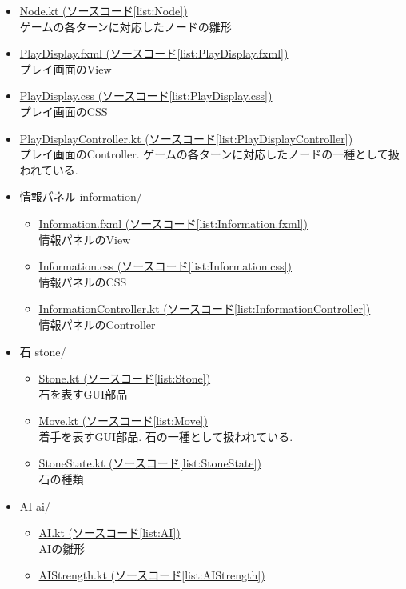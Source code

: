 \documentclass[uplatex,titlepage]{jsarticle}
\begin{document}
\begin{itemize}
\begin{itemize}
\item \underline{Node.kt (ソースコード\ref{list:Node})}\\
ゲームの各ターンに対応したノードの雛形
\item \underline{PlayDisplay.fxml (ソースコード\ref{list:PlayDisplay.fxml})}\\
プレイ画面のView
\item \underline{PlayDisplay.css (ソースコード\ref{list:PlayDisplay.css})}\\
プレイ画面のCSS
\item \underline{PlayDisplayController.kt (ソースコード\ref{list:PlayDisplayController})}\\
プレイ画面のController. ゲームの各ターンに対応したノードの一種として扱われている.
\clearpage
\item 情報パネル information/
\begin{itemize}
\item \underline{Information.fxml (ソースコード\ref{list:Information.fxml})}\\
情報パネルのView
\item \underline{Information.css (ソースコード\ref{list:Information.css})}\\
情報パネルのCSS
\item \underline{InformationController.kt (ソースコード\ref{list:InformationController})}\\
情報パネルのController
\end{itemize}
\item 石 stone/
\begin{itemize}
\item \underline{Stone.kt (ソースコード\ref{list:Stone})}\\
石を表すGUI部品
\item \underline{Move.kt (ソースコード\ref{list:Move})}\\
着手を表すGUI部品. 石の一種として扱われている.
\item \underline{StoneState.kt (ソースコード\ref{list:StoneState})}\\
石の種類
\end{itemize}
\item AI ai/
\begin{itemize}
\item \underline{AI.kt (ソースコード\ref{list:AI})}\\
AIの雛形
\item \underline{AIStrength.kt (ソースコード\ref{list:AIStrength})}\\

\end{itemize}
\end{itemize}
\end{itemize}
\end{document}
